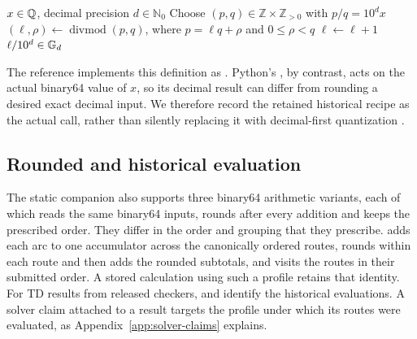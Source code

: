 \begin{algorithm}[htbp]
\caption{Exact decimal-grid quantization}\label{alg:quantize}
\begin{algorithmic}[1]
\Require $x\in\mathbb{Q}$, decimal precision $d\in\mathbb{N}_0$
\State Choose $(p,q)\in\mathbb{Z}\times\mathbb{Z}_{>0}$ with $p/q=10^d x$
\State $(\ell,\rho)\gets\operatorname{divmod}(p,q)$, where $p=\ell q+\rho$ and $0\leq\rho<q$
\State $\ell\gets\ell+1$
\EndIf
\State \Return $\ell/10^d\in\mathbb{G}_{d}$
\end{algorithmic}
\end{algorithm}

The reference implements this definition as . Python's , by contrast, acts on the actual binary64 value of $x$, so its decimal result can differ from rounding a desired exact decimal input. We therefore record the retained historical recipe as the actual call, rather than silently replacing it with decimal-first quantization \autocite{pythonRound2026}.

\subsection{Rounded and historical evaluation}
The static companion also supports three binary64 arithmetic variants, each of which reads the same binary64 inputs, rounds after every addition and keeps the prescribed order. They differ in the order and grouping that they prescribe.  adds each arc to one accumulator across the canonically ordered routes,  rounds within each route and then adds the rounded subtotals, and  visits the routes in their submitted order. A stored calculation using such a profile retains that identity. For TD results from released checkers,  and  identify the historical evaluations. A solver claim attached to a result targets the profile under which its routes were evaluated, as Appendix~\ref{app:solver-claims} explains.
